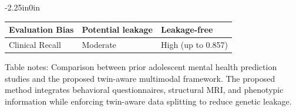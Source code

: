 \documentclass[10pt,letterpaper]{article}
\begin{document}
\begin{table}[!t]
\begin{adjustwidth}{-2.25in}{0in}
\begin{tabular}{|p{5.0cm}|p{5.5cm}|p{5.5cm}|}
                                                                                                                          \hline
                                                                                                                          Evaluation Bias & Potential leakage & Leakage-free \\
                                                                                                                          \hline
                                                                                                                          Clinical Recall & Moderate & High (up to 0.857) \\
                                                                                                                          \hline
                                                                                                                          \end{tabular}

                                                                                                                          \begin{flushleft}
                                                                                                                          Table notes: Comparison between prior adolescent mental health prediction studies
                                                                                                                          and the proposed twin-aware multimodal framework. The proposed method integrates
                                                                                                                          behavioral questionnaires, structural MRI, and phenotypic information while
                                                                                                                          enforcing twin-aware data splitting to reduce genetic leakage.
                                                                                                                          \end{flushleft}

                                                                                                                          \end{adjustwidth}
                                                                                                                          \end{table}
\end{document}
